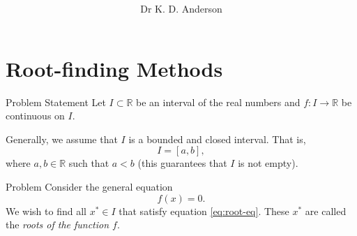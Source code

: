 \documentclass[12pt,aspectratio=169,envcountset]{beamer}
\title{\modulecode\ \modulename}
\subtitle{\topicname}
\title[\modulecode]{\modulecode\ \modulename}
\author[Dr Anderson]{Dr K. D. Anderson}
\institute[UJ]{University of Johannesburg}
\date{}
\begin{document}
\frame{\maketitle}

%
%
%
%

\section{Root-finding Methods}
\begin{frame}{Problem Statement}
  Let $I \subset \mathbb{R}$ be an interval of the real numbers and $f : I \to
  \mathbb{R}$ be continuous on $I$.

  Generally, we assume that $I$ is a bounded and closed interval.
  That is,
  \[
    I = [a, b],
  \] 
  where $a, b \in \mathbb{R}$ such that $a < b$ (this
  guarantees that $I$ is not empty).

  \begin{block}{Problem}
  Consider the general equation
  \begin{equation} \label{eq:root-eq}
    f(x) = 0.
  \end{equation}
  We wish to find all $x^* \in I$ that satisfy equation \eqref{eq:root-eq}.
  These $x^*$ are called the \emph{roots of the function $f$}.
  \end{block}
\end{frame}
\end{document}
